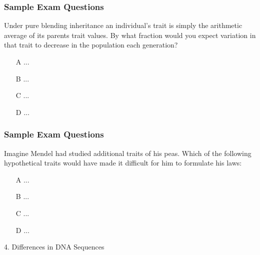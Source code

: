 \documentclass{beamer}
\begin{document}
\begin{frame}
	\frametitle{Sample Exam Questions}
	\pause
	Under pure blending inheritance an individual’s trait is simply the arithmetic average of its parents trait values. By what fraction would you expect variation in that trait to decrease in the population each generation?
	
	\begin{itemize}
	\item [A] ...
	\item [B] ...
	\item [C] ...
	\item [D] ...
\end{itemize}
\end{frame}	

\begin{frame}
	\frametitle{Sample Exam Questions}
	
	Imagine Mendel had studied additional traits of his peas. Which of the following hypothetical traits would have made it difficult for him to formulate his laws:
	
	\begin{itemize}
		\item [A] ...
		\item [B] ...
		\item [C] ...
		\item [D] ...
	\end{itemize}
	
\end{frame}	

\begin{frame}
\Large 	4. Differences in DNA Sequences
\end{frame}
\end{document}
